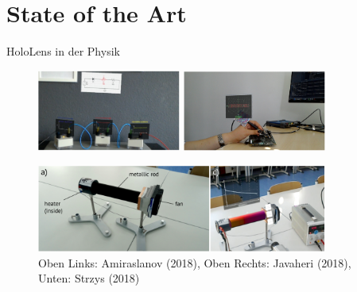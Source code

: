 \part{State of the Art}
\label{part:sota}
\begin{frame}[fragile]{HoloLens in der Physik}
\vspace{0.1cm}
\begin{figure}
	\includegraphics[width=0.42\textwidth]{images/papers/Amiraslanov18.png}
	\includegraphics[width=0.42\textwidth]{images/papers/Javaheri18.png}
	\begin{center}
	\vspace{0.03cm}
	\includegraphics[width=0.85\textwidth]{images/papers/Strzys18.png}	
	\end{center}
	\setlength{\abovecaptionskip}{7pt plus 5pt minus 2pt}
	\caption*{Oben Links: Amiraslanov (2018), Oben Rechts: Javaheri (2018), Unten: Strzys (2018)}
\end{figure}
\end{frame}

